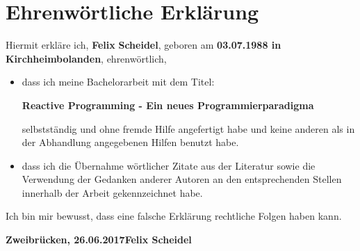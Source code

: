 \chapter*{Ehrenw\"ortliche Erkl\"arung}
Hiermit erkl\"are ich, \textbf{Felix} \textbf{Scheidel}, geboren am
\textbf{03.07.1988 in Kirchheimbolanden}, ehrenw\"ortlich,
\begin{itemize}
\item dass ich meine Bachelorarbeit mit dem Titel:

\textbf{Reactive Programming - Ein neues Programmierparadigma}

selbstst\"andig und ohne fremde Hilfe angefertigt habe und keine anderen als in der
Abhandlung angegebenen Hilfen benutzt habe.
\item dass ich die \"Ubernahme w\"ortlicher Zitate aus der Literatur
sowie die Verwendung der Gedanken anderer Autoren an den entsprechenden
Stellen innerhalb der Arbeit gekennzeichnet habe.
\end{itemize}
Ich bin mir bewusst, dass eine falsche Erkl\"arung rechtliche Folgen haben kann.
\vspace*{3cm}

\textbf{Zweibr\"ucken, 26.06.2017}\hfill\textbf{Felix Scheidel}
